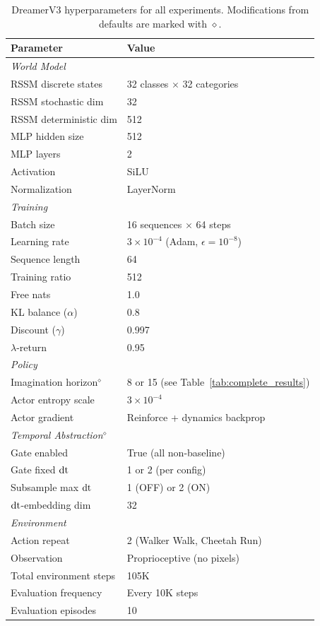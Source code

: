 \begin{table}[ht]
\centering
\caption{DreamerV3 hyperparameters for all experiments. Modifications from defaults are marked with $\diamond$.}
\label{tab:hyperparams}
\small
\begin{tabular}{ll}
\toprule
\textbf{Parameter} & \textbf{Value} \\
\midrule
\multicolumn{2}{l}{\textit{World Model}} \\
RSSM discrete states & 32 classes $\times$ 32 categories \\
RSSM stochastic dim & 32 \\
RSSM deterministic dim & 512 \\
MLP hidden size & 512 \\
MLP layers & 2 \\
Activation & SiLU \\
Normalization & LayerNorm \\
\midrule
\multicolumn{2}{l}{\textit{Training}} \\
Batch size & 16 sequences $\times$ 64 steps \\
Learning rate & $3 \times 10^{-4}$ (Adam, $\epsilon{=}10^{-8}$) \\
Sequence length & 64 \\
Training ratio & 512 \\
Free nats & 1.0 \\
KL balance ($\alpha$) & 0.8 \\
Discount ($\gamma$) & 0.997 \\
$\lambda$-return & 0.95 \\
\midrule
\multicolumn{2}{l}{\textit{Policy}} \\
Imagination horizon$^\diamond$ & 8 or 15 (see Table~\ref{tab:complete_results}) \\
Actor entropy scale & $3 \times 10^{-4}$ \\
Actor gradient & Reinforce + dynamics backprop \\
\midrule
\multicolumn{2}{l}{\textit{Temporal Abstraction}$^\diamond$} \\
Gate enabled & True (all non-baseline) \\
Gate fixed $\mathrm{dt}$ & 1 or 2 (per config) \\
Subsample max $\mathrm{dt}$ & 1 (OFF) or 2 (ON) \\
$\mathrm{dt}$-embedding dim & 32 \\
\midrule
\multicolumn{2}{l}{\textit{Environment}} \\
Action repeat & 2 (Walker Walk, Cheetah Run) \\
Observation & Proprioceptive (no pixels) \\
Total environment steps & 105K \\
Evaluation frequency & Every 10K steps \\
Evaluation episodes & 10 \\
\bottomrule
\end{tabular}
\end{table}

